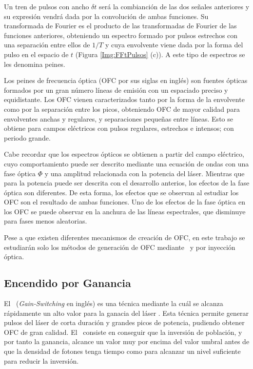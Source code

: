 	Un tren de pulsos con ancho $\delta t$ ser\'a la combianci\'on de las dos señales anteriores y su expresi\'on vendr\'a dada por la convoluci\'on de ambas funciones. Su transformada de Fourier es el producto de las transformadas de Fourier de las funciones anteriores, obteniendo un espectro formado por pulsos estrechos con una separaci\'on entre ellos de $1/T$ y cuya envolvente viene dada por la forma del pulso en el espacio de $t$ (Figura \ref{Img:FFtPulsos} (c)). A este tipo de espectros se les denomina peines.

Los peines de frecuencia \'optica (OFC por sus siglas en ingl\'es) son fuentes \'opticas formados por un gran n\'umero l\'ineas de emisi\'on con un espaciado preciso y equidistante. Los OFC vienen caracterizados tanto por la forma de la envolvente como por la separaci\'on entre los picos, obteniendo OFC de mayor calidad para envolventes anchas y regulares, y separaciones pequeñas entre l\'ineas. Esto se obtiene para campos el\'ectricos con pulsos regulares, estrechos e intensos; con periodo grande.

Cabe recordar que los espectros \'opticos se obtienen a partir del campo el\'ectrico, cuyo comportamiento puede ser descrito mediante una ecuaci\'on de ondas con una fase \'optica $\Phi$ y una amplitud relacionada con la potencia del l\'aser. Mientras que para la potencia puede ser descrita con el desarrollo anterios, los efectos de la fase \'optica son diferentes. De esta forma, los efectos que se observan al estudiar los OFC son el resultado de ambas funciones. Uno de los efectos de la fase \'optica en los OFC se puede observar en la anchura de las l\'ineas espectrales, que disminuye para fases menos aleatorias.

Pese a que existen diferentes mecanismos de creaci\'on de OFC, en este trabajo se estudiar\'an solo los m\'etodos de generaci\'on de OFC mediante \gs\ y por inyecci\'on \'optica.

	\subsection{Encendido por Ganancia}
		\label{Intr:OFC:GS}

		El \gs\ (\textit{Gain-Switching} en ingl\'es) es una t\'ecnica mediante la cu\'al se alcanza r\'apidamente un alto valor para la ganacia del l\'aser \cite{principles}. Esta t\'ecnica permite generar pulsos del l\'aser de corta duraci\'on y grandes picos de potencia, pudiendo obtener OFC de gran calidad. El \gs\ consiste en conseguir que la inversi\'on de poblaci\'on, y por tanto la ganancia, alcance un valor muy por encima del valor umbral antes de que la densidad de fotones tenga tiempo como para alcanzar un nivel suficiente para reducir la inversi\'on. 
		
